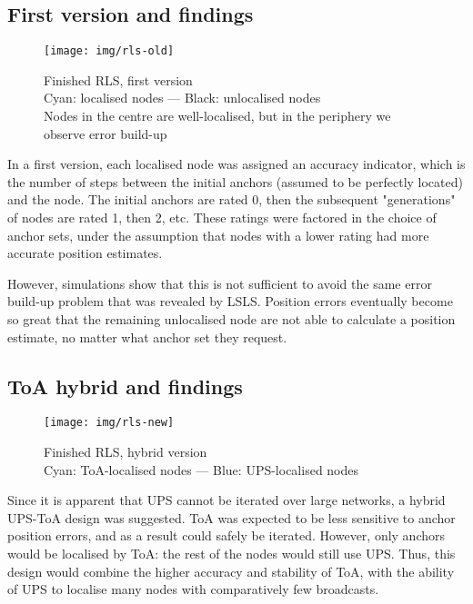 \documentclass[12pt,a4paper,fleqn]{report}
\begin{document}
\subsection{First version and findings}

\begin{figure}[h]
	\centering
	\texttt{[image: img/rls-old]}
	\caption{%
	Finished RLS, first version \\
	Cyan: localised nodes —
	Black: unlocalised nodes \\
	Nodes in the centre are well-localised, but in the periphery we observe error build-up
	}
\end{figure}

In a first version, each localised node was assigned an accuracy indicator, which is the number of steps between the initial anchors (assumed to be perfectly located) and the node. The initial anchors are rated 0, then the subsequent "generations" of nodes are rated 1, then 2, etc. These ratings were factored in the choice of anchor sets, under the assumption that nodes with a lower rating had more accurate position estimates.

However, simulations show that this is not sufficient to avoid the same error build-up problem that was revealed by LSLS. Position errors eventually become so great that the remaining unlocalised node are not able to calculate a position estimate, no matter what anchor set they request.

\FloatBarrier

\subsection{ToA hybrid and findings}

\begin{figure}[h]
	\centering
	\texttt{[image: img/rls-new]}
	\caption{%
	Finished RLS, hybrid version \\
	Cyan: ToA-localised nodes —
	Blue: UPS-localised nodes
	}
\end{figure}

Since it is apparent that UPS cannot be iterated over large networks, a hybrid UPS-ToA design was suggested. ToA was expected to be less sensitive to anchor position errors, and as a result could safely be iterated. However, only anchors would be localised by ToA: the rest of the nodes would still use UPS. Thus, this design would combine the higher accuracy and stability of ToA, with the ability of UPS to localise many nodes with comparatively few broadcasts.
\end{document}
